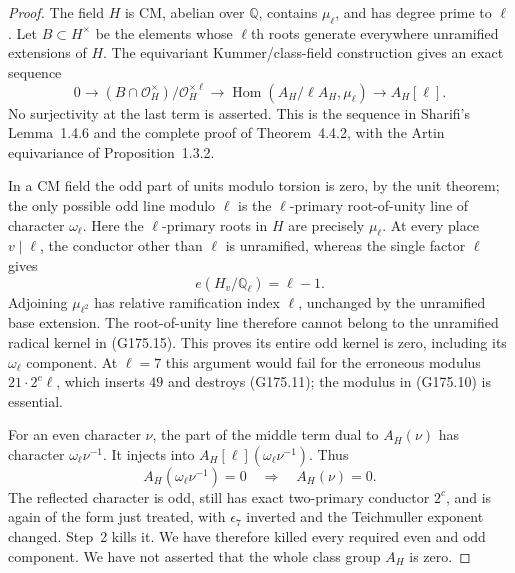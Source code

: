 \begin{proof}
The field $H$ is CM, abelian over $\mathbb Q$, contains $\mu_\ell$,
and has degree prime to $\ell$.
Let $B\subset H^\times$ be the elements whose $\ell$th roots
generate everywhere unramified extensions of $H$.
The equivariant Kummer/class-field construction gives an exact
sequence
\[
 0\longrightarrow
 (B\cap\mathcal O_H^\times)/\mathcal O_H^{\times\ell}
 \longrightarrow\operatorname{Hom}(A_H/\ell A_H,\mu_\ell)
 \longrightarrow A_H[\ell].
 \tag{G175.15}
\]
No surjectivity at the last term is asserted.
This is the sequence in Sharifi's Lemma~1.4.6 and the complete
proof of Theorem~4.4.2, with the Artin equivariance of
Proposition~1.3.2.

In a CM field the odd part of units modulo torsion is zero, by
the unit theorem; the only possible odd line modulo $\ell$ is
the $\ell$-primary root-of-unity line of character $\omega_\ell$.
Here the $\ell$-primary roots in $H$ are precisely $\mu_\ell$.
At every place $v\mid\ell$, the conductor other than $\ell$ is
unramified, whereas the single factor $\ell$ gives
\[
                    e(H_v/\mathbb Q_\ell)=\ell-1.
 \tag{G175.16}
\]
Adjoining $\mu_{\ell^2}$ has relative ramification index $\ell$,
unchanged by the unramified base extension.  The root-of-unity
line therefore cannot belong to the unramified radical kernel
in (G175.15).  This proves its entire odd kernel is zero,
including its $\omega_\ell$ component.
At $\ell=7$ this argument would fail for the erroneous modulus
$21\cdot2^c\ell$, which inserts $49$ and destroys (G175.11);
the modulus in (G175.10) is essential.

For an even character $\nu$, the part of the middle term dual
to $A_H(\nu)$ has character $\omega_\ell\nu^{-1}$.
It injects into $A_H[\ell](\omega_\ell\nu^{-1})$.  Thus
\[
 A_H(\omega_\ell\nu^{-1})=0\quad\Longrightarrow\quad A_H(\nu)=0.
 \tag{G175.17}
\]
The reflected character is odd, still has exact two-primary
conductor $2^c$, and is again of the form just treated, with
$\epsilon_7$ inverted and the Teichmuller exponent changed.
Step~2 kills it.  We have therefore killed every required even
and odd component.  We have not asserted that the whole class
group $A_H$ is zero.


\end{proof}
